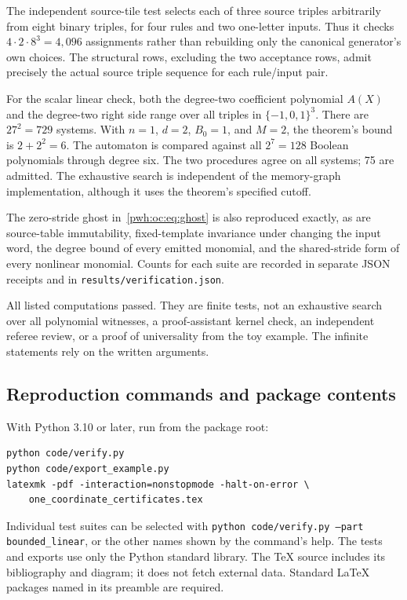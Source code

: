 \documentclass[11pt,letterpaper]{article}
\numberwithin{equation}{section}
\theoremstyle{definition}
\newcommand{\code}[1]{\texttt{\small #1}}
\begin{document}
The independent source-tile test selects each of three source triples
arbitrarily from eight binary triples, for four rules and two one-letter
inputs. Thus it checks $4\cdot2\cdot8^3=4{,}096$ assignments rather than
rebuilding only the canonical generator's own choices. The structural
rows, excluding the two acceptance rows, admit precisely the actual
source triple sequence for each rule/input pair.

For the scalar linear check, both the degree-two coefficient polynomial
$A(X)$ and the degree-two right side range over all triples in
$\{-1,0,1\}^3$. There are $27^2=729$ systems. With $n=1$, $d=2$,
$B_0=1$, and $M=2$, the theorem's bound is $2+2^2=6$.
The automaton is compared against all $2^7=128$ Boolean polynomials
through degree six. The two procedures agree on all systems; 75 are
admitted. The exhaustive search is independent of the memory-graph
implementation, although it uses the theorem's specified cutoff.

The zero-stride ghost in~\eqref{pwh:oc:eq:ghost} is also reproduced exactly,
as are source-table immutability, fixed-template invariance under changing
the input word, the degree bound of every emitted monomial, and the
shared-stride form of every nonlinear monomial. Counts for each suite
are recorded in separate JSON receipts and in
\code{results/verification.json}.

All listed computations passed. They are finite tests, not an exhaustive
search over all polynomial witnesses, a proof-assistant kernel check,
an independent referee review, or a proof of universality from the toy
example. The infinite statements rely on the written arguments.

\subsection{Reproduction commands and package contents}

With Python 3.10 or later, run from the package root:
\begin{verbatim}
python code/verify.py
python code/export_example.py
latexmk -pdf -interaction=nonstopmode -halt-on-error \
    one_coordinate_certificates.tex
\end{verbatim}
Individual test suites can be selected with
\code{python code/verify.py --part bounded\_linear}, or the other names
shown by the command's help. The tests and exports use only the Python
standard library. The TeX source includes its bibliography and diagram;
it does not fetch external data. Standard LaTeX packages named in its
preamble are required.
\end{document}
